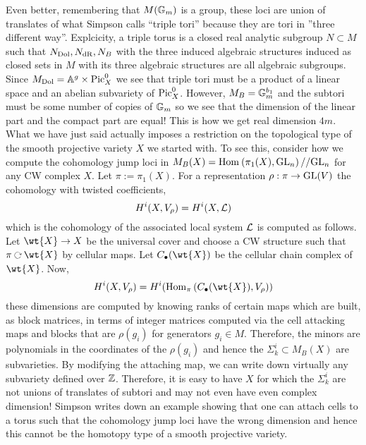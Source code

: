 \documentclass[12pt]{article}
\begin{document}
Even better, remembering that $M(\mathbb{G}_m)$ is a group, these loci are union of translates of what Simpson calls ``triple tori'' because they are tori in ''three different way''. Explcicity, a triple torus is a closed real analytic subgroup $N \subset M$ such that $N_{\mathrm{Dol}}, N_{\mathrm{dR}}, N_B$ with the three induced algebraic structures induced as closed sets in $M$ with its three algebraic structures are all algebraic subgroups. Since $M_{\mathrm{Dol}} = \mathbb{A}^g \times \mathrm{Pic}^0_X$ we see that triple tori must be a product of a linear space and an abelian subvariety of $\mathrm{Pic}^0_X$. However, $M_B = \mathbb{G}_m^{b_1}$ and the subtori must be some number of copies of $\mathbb{G}_m$ so we see that the dimension of the linear part and the compact part are equal! This is how we get real dimension $4m$.
\bigskip\\
What we have just said actually imposes a restriction on the topological type of the smooth projective variety $X$ we started with. To see this, consider how we compute the cohomology jump loci in $M_B(X) = \mathrm{Hom}_{} \left( \pi_1(X), \mathrm{GL}_n \right)//\mathrm{GL}_n$ for any CW complex $X$. Let $\pi := \pi_1(X)$. For a representation $\rho : \pi \to \mathrm{GL}(V)$ the cohomology with twisted coefficients,
\[ H^i(X, V_\rho) = H^i(X, \mathcal{L}) \]
which is the cohomology of the associated local system $\mathcal{L}$ is computed as follows. Let $\wt{X} \to X$ be the universal cover and choose a CW structure such that $\pi \acts \wt{X}$ by cellular maps. Let $C_\bullet(\wt{X})$ be the cellular chain complex of $\wt{X}$. Now, 
\[ H^i(X, V_\rho) = H^i(\Hom{\pi}{C_\bullet(\wt{X})}{V_\rho}) \]
these dimensions are computed by knowing ranks of certain maps which are built, as block matrices, in terms of integer matrices computed via the cell attacking maps and blocks that are $\rho(g_i)$ for generators $g_i \in M$. Therefore, the minors are polynomials in the coordinates of the $\rho(g_i)$ and hence the $\Sigma^i_k \subset M_B(X)$ are subvarieties. By modifying the attaching map, we can write down virtually any subvariety defined over $\mathbb{Z}$. Therefore, it is easy to have $X$ for which the $\Sigma^i_k$ are not unions of translates of subtori and may not even have even complex dimension! Simpson writes down an example showing that one can attach cells to a torus such that the cohomology jump loci have the wrong dimension and hence this cannot be the homotopy type of a smooth projective variety.
\end{document}
